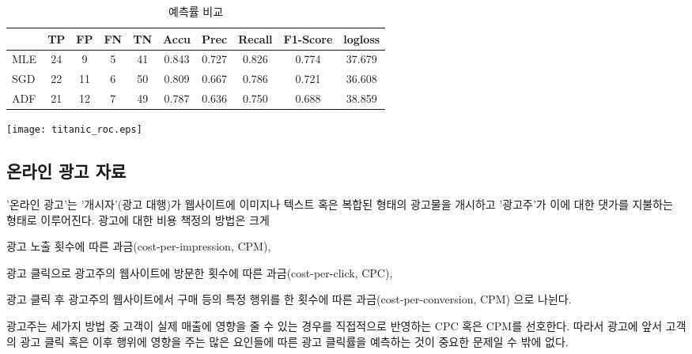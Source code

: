 \documentclass[oneside,b5paper,11pt]{book} %
\begin{document}
\begin{table}[ht]
	\centering
	\begin{tabular}{cccccccccc}
	\hline\hline
	\textbf{} & \textbf{TP} & \textbf{FP} & \textbf{FN} & \textbf{TN} & \textbf{Accu} & \textbf{Prec} & \textbf{Recall} & \textbf{F1-Score} & \textbf{logloss}  \\ 
	\hline 
	
	\multicolumn {1}{l|}{MLE} & 24 & 9  & 5 & 41 & 0.843 & 0.727 & 0.826 & 0.774 & 37.679 \\ \hline
	\multicolumn {1}{l|}{SGD} & 22 & 11 & 6 & 50 & 0.809 & 0.667 & 0.786 & 0.721 & 36.608 \\ \hline
	\multicolumn {1}{l|}{ADF} & 21 & 12 & 7 & 49 & 0.787 & 0.636 & 0.750 & 0.688 & 38.859 \\ \hline

	\hline
	\end{tabular}
	
	\caption[예측률 비교]{예측률 비교}
\end{table}


\begin{center}
\texttt{[image: titanic\_roc.eps]} %
\end{center}





\subsection{온라인 광고 자료}
 '온라인 광고'는 '개시자'(광고 대행)가 웹사이트에 이미지나 텍스트 혹은 복합된 형태의 광고물을 개시하고 '광고주'가 이에 대한 댓가를 지불하는 형태로 이루어진다. 광고에 대한 비용 책정의 방법은 크게
 \begin{inparaenum}[i)]
 \item 광고 노출 횟수에 따른 과금(cost-per-impression, CPM),
 \item 광고 클릭으로 광고주의 웹사이트에 방문한 횟수에 따른 과금(cost-per-click, CPC),
 \item 광고 클릭 후 광고주의 웹사이트에서 구매 등의 특정 행위를 한 횟수에 따른 과금(cost-per-conversion, CPM) 으로 나뉜다.
 \end{inparaenum}
 광고주는 세가지 방법 중 고객이 실제 매출에 영향을 줄 수 있는 경우를 직접적으로 반영하는 CPC 혹은 CPM를 선호한다. 따라서 광고에 앞서 고객의 광고 클릭 혹은 이후 행위에 영향을 주는 많은 요인들에 따른 광고 클릭률을 예측하는 것이 중요한 문제일 수 밖에 없다.\citep{Chapelle2013}
 
\end{document}
